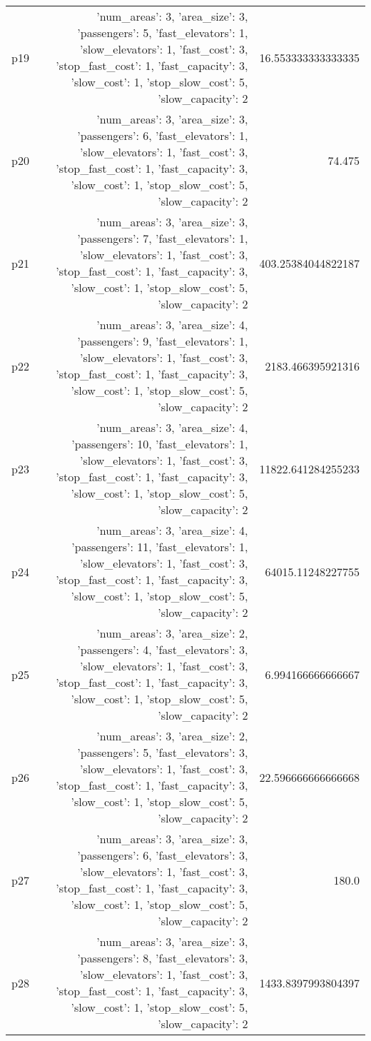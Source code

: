 \documentclass{article}
\begin{document}
\begin{center}
\begin{tabular}{r|r|r}
  p19&{'num\_areas': 3, 'area\_size': 3, 'passengers': 5, 'fast\_elevators': 1, 'slow\_elevators': 1, 'fast\_cost': 3, 'stop\_fast\_cost': 1, 'fast\_capacity': 3, 'slow\_cost': 1, 'stop\_slow\_cost': 5, 'slow\_capacity': 2}&16.553333333333335\\
  p20&{'num\_areas': 3, 'area\_size': 3, 'passengers': 6, 'fast\_elevators': 1, 'slow\_elevators': 1, 'fast\_cost': 3, 'stop\_fast\_cost': 1, 'fast\_capacity': 3, 'slow\_cost': 1, 'stop\_slow\_cost': 5, 'slow\_capacity': 2}&74.475\\
  p21&{'num\_areas': 3, 'area\_size': 3, 'passengers': 7, 'fast\_elevators': 1, 'slow\_elevators': 1, 'fast\_cost': 3, 'stop\_fast\_cost': 1, 'fast\_capacity': 3, 'slow\_cost': 1, 'stop\_slow\_cost': 5, 'slow\_capacity': 2}&403.25384044822187\\
  p22&{'num\_areas': 3, 'area\_size': 4, 'passengers': 9, 'fast\_elevators': 1, 'slow\_elevators': 1, 'fast\_cost': 3, 'stop\_fast\_cost': 1, 'fast\_capacity': 3, 'slow\_cost': 1, 'stop\_slow\_cost': 5, 'slow\_capacity': 2}&2183.466395921316\\
  p23&{'num\_areas': 3, 'area\_size': 4, 'passengers': 10, 'fast\_elevators': 1, 'slow\_elevators': 1, 'fast\_cost': 3, 'stop\_fast\_cost': 1, 'fast\_capacity': 3, 'slow\_cost': 1, 'stop\_slow\_cost': 5, 'slow\_capacity': 2}&11822.641284255233\\
  p24&{'num\_areas': 3, 'area\_size': 4, 'passengers': 11, 'fast\_elevators': 1, 'slow\_elevators': 1, 'fast\_cost': 3, 'stop\_fast\_cost': 1, 'fast\_capacity': 3, 'slow\_cost': 1, 'stop\_slow\_cost': 5, 'slow\_capacity': 2}&64015.11248227755\\
  p25&{'num\_areas': 3, 'area\_size': 2, 'passengers': 4, 'fast\_elevators': 3, 'slow\_elevators': 1, 'fast\_cost': 3, 'stop\_fast\_cost': 1, 'fast\_capacity': 3, 'slow\_cost': 1, 'stop\_slow\_cost': 5, 'slow\_capacity': 2}&6.994166666666667\\
  p26&{'num\_areas': 3, 'area\_size': 2, 'passengers': 5, 'fast\_elevators': 3, 'slow\_elevators': 1, 'fast\_cost': 3, 'stop\_fast\_cost': 1, 'fast\_capacity': 3, 'slow\_cost': 1, 'stop\_slow\_cost': 5, 'slow\_capacity': 2}&22.596666666666668\\
  p27&{'num\_areas': 3, 'area\_size': 3, 'passengers': 6, 'fast\_elevators': 3, 'slow\_elevators': 1, 'fast\_cost': 3, 'stop\_fast\_cost': 1, 'fast\_capacity': 3, 'slow\_cost': 1, 'stop\_slow\_cost': 5, 'slow\_capacity': 2}&180.0\\
  p28&{'num\_areas': 3, 'area\_size': 3, 'passengers': 8, 'fast\_elevators': 3, 'slow\_elevators': 1, 'fast\_cost': 3, 'stop\_fast\_cost': 1, 'fast\_capacity': 3, 'slow\_cost': 1, 'stop\_slow\_cost': 5, 'slow\_capacity': 2}&1433.8397993804397\\

\end{tabular}
\end{center}
\end{document}

